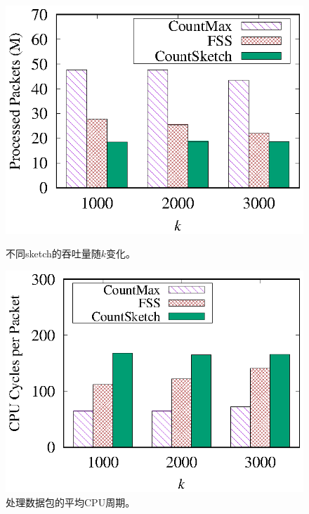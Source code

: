 \begin{figure}[!t]
	\centering
	\begin{minipage}[t]{0.48\linewidth}		
		\centering
		\includegraphics[width=\linewidth]{fig/throughput.eps}
		\caption{\textnormal{不同sketch的吞吐量随$k$变化。}}
		\label{fig:prototype,bandwidth}
	\end{minipage}\vspace{-0.6em}\hspace{0.4em}
	\begin{minipage}[t]{0.48\linewidth}
	\centering
        \includegraphics[width=\linewidth]{fig/k_cpu_2000.eps}
        \caption{\textnormal{处理数据包的平均CPU周期。}}
        \label{fig:prototype,cycle}
	\end{minipage}\vspace{-0.6em}
\end{figure}


